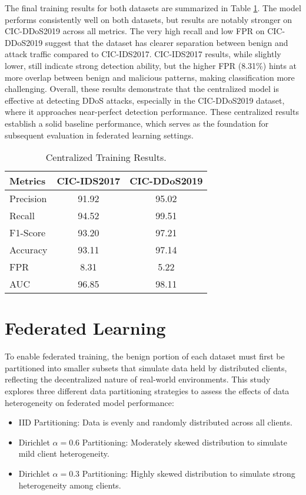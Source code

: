 The final training results for both datasets are summarized in Table \ref{tbl:central_train_results}. The model performs consistently well on both datasets, but results are notably stronger on CIC-DDoS2019 across all metrics. The very high recall and low FPR on CIC-DDoS2019 suggest that the dataset has clearer separation between benign and attack traffic compared to CIC-IDS2017. CIC-IDS2017 results, while slightly lower, still indicate strong detection ability, but the higher FPR (8.31\%) hints at more overlap between benign and malicious patterns, making classification more challenging. Overall, these results demonstrate that the centralized model is effective at detecting DDoS attacks, especially in the CIC-DDoS2019 dataset, where it approaches near-perfect detection performance. These centralized results establish a solid baseline performance, which serves as the foundation for subsequent evaluation in federated learning settings.

\begin{table}[h]
    \caption{Centralized Training Results.}
    \centering
    \begin{tabular}{l|c|c}
        Metrics & CIC-IDS2017 & CIC-DDoS2019 \\
        \hline\hline
        Precision & 91.92 & 95.02 \\
        Recall & 94.52 & 99.51 \\
        F1-Score & 93.20 & 97.21 \\
        Accuracy & 93.11 & 97.14 \\
        FPR & 8.31 & 5.22 \\
        AUC & 96.85 & 98.11 \\
    \end{tabular}
    \label{tbl:central_train_results}
\end{table}

\section{Federated Learning}

To enable federated training, the benign portion of each dataset must first be partitioned into smaller subsets that simulate data held by distributed clients, reflecting the decentralized nature of real-world environments. This study explores three different data partitioning strategies to assess the effects of data heterogeneity on federated model performance:

\begin{itemize}
    \item IID Partitioning: Data is evenly and randomly distributed across all clients.
    \item Dirichlet $\alpha=0.6$ Partitioning: Moderately skewed distribution to simulate mild client heterogeneity.
    \item Dirichlet $\alpha=0.3$ Partitioning: Highly skewed distribution to simulate strong heterogeneity among clients.
\end{itemize}

